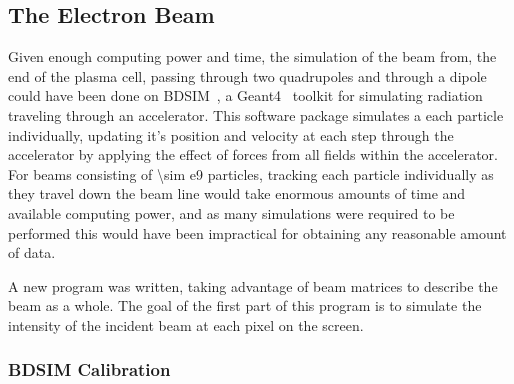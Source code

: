 \subsection{The Electron Beam}

Given enough computing power and time, the simulation of the beam from, the end
of the plasma cell, passing through two quadrupoles and through a dipole could
have been done on BDSIM~\cite{agapov2009bdsim}, a
Geant4~\cite{agostinelli2003geant4} toolkit for simulating radiation traveling
through an accelerator. This software package simulates a each particle
individually, updating it's position and velocity at each step through the
accelerator by applying the effect of forces from all fields within the
accelerator.  For beams consisting of \num{\sim e9} particles, tracking each
particle individually as they travel down the beam line would take enormous
amounts of time and available computing power, and as many simulations were
required to be performed this would have been impractical for obtaining any
reasonable amount of data.

A new program was written, taking advantage of beam matrices to describe the
beam as a whole. The goal of the first part of this program is to simulate the
intensity of the incident beam at each pixel on the screen.

\subsubsection{BDSIM Calibration}


